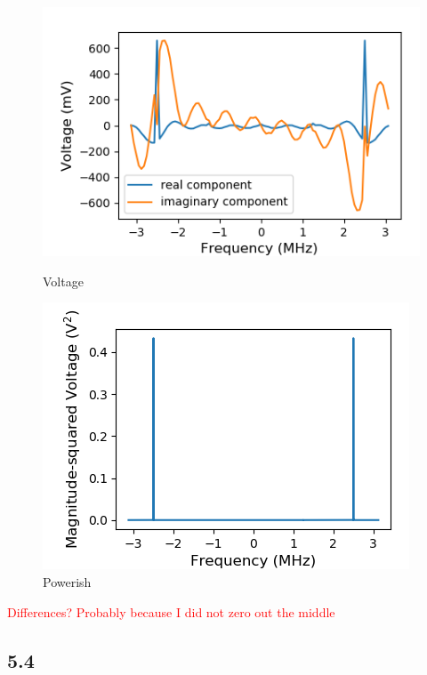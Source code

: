 \documentclass[a4paper]{article}
\begin{document}
\begin{figure}
\centering
\begin{minipage}{.5\textwidth}
	\centering
	\includegraphics[width=.8\linewidth]{5-3/volt3}
	\caption{Voltage}
	\label{fig:inverse}
\end{minipage}%
\begin{minipage}{.5\textwidth}
	\centering
	\includegraphics[width=.8\linewidth]{5-3/pow3}
	\caption{Powerish}
	\label{fig:ACF}
\end{minipage}
\end{figure}

\textcolor{red}{Differences? Probably because I did not zero out the middle}

\subsection{5.4}
\end{document}
